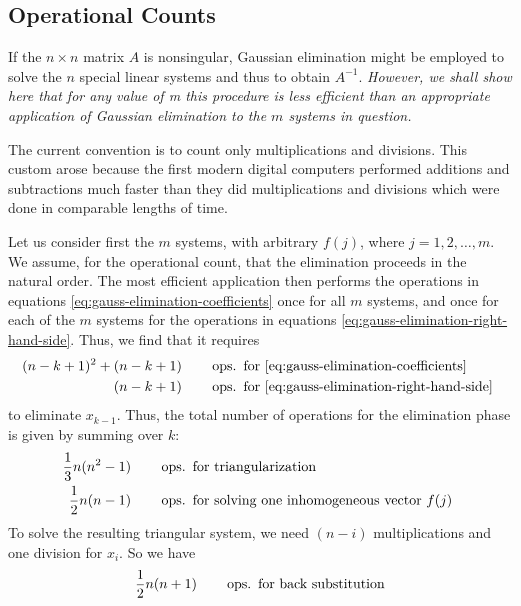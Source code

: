\documentclass[../main.tex]{subfiles}
\begin{document}
\subsection{Operational Counts}
If the $n \times n$ matrix $A$ is nonsingular, Gaussian elimination might be employed to solve the $n$ special linear systems and thus to obtain $A^{-1}$. \emph{However, we shall show here that for any value of m this procedure is less efficient than an appropriate application of Gaussian elimination to the $m$ systems in question.}

The current convention is to count only multiplications and divisions. This custom arose because the first modern digital computers performed additions and subtractions much faster than they did multiplications and divisions which were done in comparable lengths of time.

Let us consider first the $m$ systems, with arbitrary $f(j)$, where $j = 1, 2, \ldots, m$. We assume, for the operational count, that the elimination proceeds in the natural order. The most efficient application then performs the operations in equations \eqref{eq:gauss-elimination-coefficients} once for all $m$ systems, and once for each of the $m$ systems for the operations in equations \eqref{eq:gauss-elimination-right-hand-side}. Thus, we find that it requires
\begin{equation*}
	\begin{aligned}
		(n-k+1)^2 + (n-k+1) & \qquad \operatorname{ops.} \text{ for \eqref{eq:gauss-elimination-coefficients} }    \\
		(n-k+1)             & \qquad \operatorname{ops.} \text{ for \eqref{eq:gauss-elimination-right-hand-side} }
	\end{aligned}
\end{equation*}
to eliminate $x_{k-1}$. Thus, the total number of operations for the elimination phase is given by summing over $k$:
\begin{equation*}
	\begin{aligned}
		\frac{1}{3} n (n^2 - 1) & \qquad \operatorname{ops.} \text{ for triangularization}                        \\
		\frac{1}{2} n (n-1)     & \qquad \operatorname{ops.} \text{ for solving one inhomogeneous vector $f(j)$ }
	\end{aligned}
\end{equation*}
To solve the resulting triangular system, we need $(n-i)$ multiplications and one division for $x_i$. So we have
\begin{equation*}
	\frac{1}{2} n (n+1) \qquad \operatorname{ops.} \text{ for back substitution}
\end{equation*}
\end{document}
